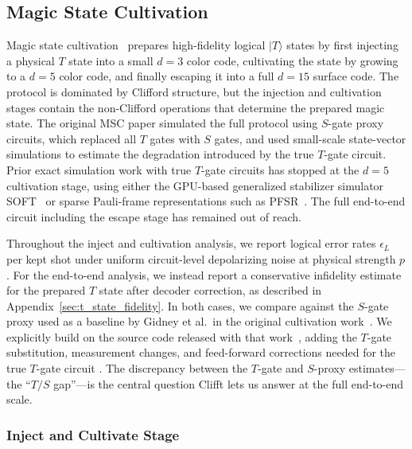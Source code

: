 \documentclass[a4paper, onecolumn, unpublished]{quantumarticle}
\begin{document}
    \FloatBarrier
    \subsection{Magic State Cultivation}
    \label{sec:results_msc}

    Magic state cultivation~\cite{gidneyMagicStateCultivation2024} prepares high-fidelity logical $|T\rangle$ states by first injecting a physical $T$ state into a small $d=3$ color code, cultivating the state by growing to a $d=5$ color code, and finally escaping it into a full $d=15$ surface code. The protocol is dominated by Clifford structure, but the injection and cultivation stages contain the non-Clifford operations that determine the prepared magic state. The original MSC paper simulated the full protocol using $S$-gate proxy circuits, which replaced all $T$ gates with $S$ gates, and used small-scale state-vector simulations to estimate the degradation introduced by the true $T$-gate circuit. Prior exact simulation work with true $T$-gate circuits has stopped at the $d{=}5$ cultivation stage, using either the GPU-based generalized stabilizer simulator SOFT~\cite{liSOFTHighperformanceSimulator2025} or sparse Pauli-frame representations such as PFSR~\cite{tuloupComputingLogicalError2026a}. The full end-to-end circuit including the escape stage has remained out of reach.

    Throughout the inject and cultivation analysis, we report logical error rates $\epsilon_L$ per kept shot under uniform circuit-level depolarizing noise at physical strength $p$. For the end-to-end analysis, we instead report a conservative infidelity estimate for the prepared $T$ state after decoder correction, as described in Appendix~\ref{sec:t_state_fidelity}. In both cases, we compare against the $S$-gate proxy used as a baseline by Gidney et al.\ in the original cultivation work~\cite{gidneyMagicStateCultivation2024}. We explicitly build on the source code released with that work~\cite{mscGithub}, adding the $T$-gate substitution, measurement changes, and feed-forward corrections needed for the true $T$-gate circuit \cite{clifftPaperRepo}. The discrepancy between the $T$-gate and $S$-proxy estimates---the ``$T/S$ gap''---is the central question Clifft lets us answer at the full end-to-end scale.

    \subsubsection{Inject and Cultivate Stage}
    \label{sec:results_msc_ic}
\end{document}
